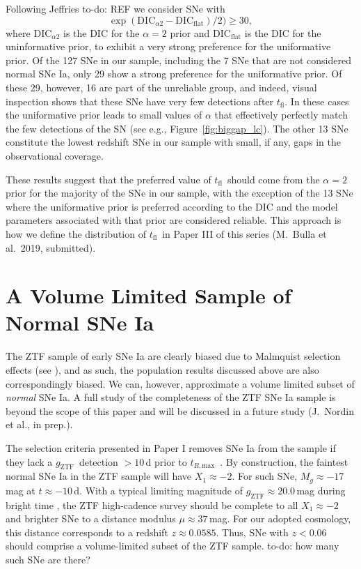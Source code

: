 \documentclass[twocolumn]{./aastex63}
\newcommand{\todo}[1]{{\color{magenta} to-do: {#1}}}
\newcommand{\gztf}{$g_\mathrm{ZTF}$}
\newcommand{\tfl}{$t_\mathrm{fl}$}
\newcommand{\tbmax}{$t_{B,\mathrm{max}}$}
\begin{document}
Following Jeffries \todo{REF} we consider SNe with
%
$$\exp(\mathrm{DIC}_{\alpha2} - \mathrm{DIC}_\mathrm{flat})/2) \ge 30,$$
%
where $\mathrm{DIC}_{\alpha2}$ is the DIC for the $\alpha = 2$ prior and
$\mathrm{DIC}_\mathrm{flat}$ is the DIC for the uninformative prior, to exhibit
a very strong preference for the uniformative prior. Of the 127 SNe in our
sample, including the 7 SNe that are not considered normal SNe Ia, only 29 show
a strong preference for the uniformative prior. Of these 29, however, 16 are
part of the unreliable group, and indeed, visual inspection shows that these SNe
have very few detections after \tfl. In these cases the uniformative prior leads
to small values of $\alpha$ that effectively perfectly match the few detections
of the SN (see e.g., Figure~\ref{fig:biggap_lc}). The other 13 SNe constitute
the lowest redshift SNe in our sample with small, if any, gaps in the
observational coverage.

These results suggest that the preferred value of \tfl\ should come from the
$\alpha = 2$ prior for the majority of the SNe in our sample, with the exception
of the 13 SNe where the uniformative prior is preferred according to the DIC and
the model parameters associated with that prior are considered reliable. This
approach is how we define the distribution of \tfl\ in Paper III of this series
(M.~Bulla et al.~2019, submitted).

\section{A Volume Limited Sample of Normal SNe Ia}

The ZTF sample of early SNe Ia are clearly biased due to Malmquist selection
effects (see \citealt{Yao19}), and as such, the population results discussed
above are also correspondingly biased. We can, however, approximate a volume
limited subset of \textit{normal} SNe Ia. A full study of the completeness of
the ZTF SNe Ia sample is beyond the scope of this paper and will be discussed in
a future study (J.~Nordin et al., in prep.).

The selection criteria presented in Paper I removes SNe Ia from the sample if
they lack a \gztf\ detection $> 10$\,d prior to \tbmax\ \citep{Yao19}. By
construction, the faintest normal SNe Ia in the ZTF sample will have $X_1
\approx -2$. For such SNe, $M_g \approx -17$\,mag at $t \approx -10$\,d. With a
typical limiting magnitude of \gztf$ \approx 20.0$\,mag during bright time
\citep{Bellm19}, the ZTF high-cadence survey should be complete to all $X_1
\approx -2$ and brighter SNe to a distance modulus $\mu \approx 37$\,mag. For
our adopted cosmology, this distance corresponds to a redshift $z \approx
0.0585$. Thus, SNe with $z < 0.06$ should comprise a volume-limited subset of
the ZTF sample. \todo{how many such SNe are there?}
\end{document}
